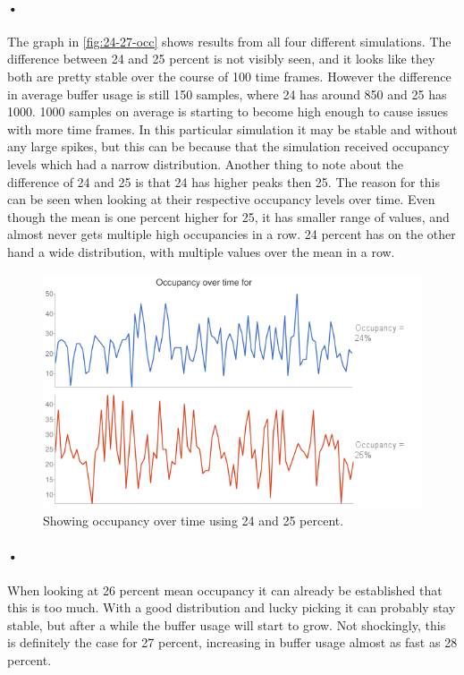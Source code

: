 \documentclass[a4paper, 12pt]{report}\dfrac{\right }{•}
\begin{document}
\paragraph{•}
The graph in \ref{fig:24-27-occ} shows results from all four different simulations.
The difference between 24 and 25 percent is not visibly seen, and it looks like they both are pretty stable over the course of 100 time frames.
However the difference in average buffer usage is still 150 samples, where 24 has around 850 and 25 has 1000.
1000 samples on average is starting to become high enough to cause issues with more time frames.
In this particular simulation it may be stable and without any large spikes, but this can be because that the simulation received occupancy levels which had a narrow distribution.
Another thing to note about the difference of 24 and 25 is that 24 has higher peaks then 25.
The reason for this can be seen when looking at their respective occupancy levels over time.
Even though the mean is one percent higher for 25, it has smaller range of values, and almost never gets multiple high occupancies in a row.
24 percent has on the other hand a wide distribution, with multiple values over the mean in a row. 

\begin{figure}[h!]
	\centering
		\includegraphics[width=1.0\textwidth]{images/occ-over-time.png}
		\caption{Showing occupancy over time using 24 and 25 percent.}
		\label{fig:occ-over-time}
\end{figure}

\paragraph{•}
When looking at 26 percent mean occupancy it can already be established that this is too much.
With a good distribution and lucky picking it can probably stay stable, but after a while the buffer usage will start to grow.
Not shockingly, this is definitely the case for 27 percent, increasing in buffer usage almost as fast as 28 percent.
\end{document}
